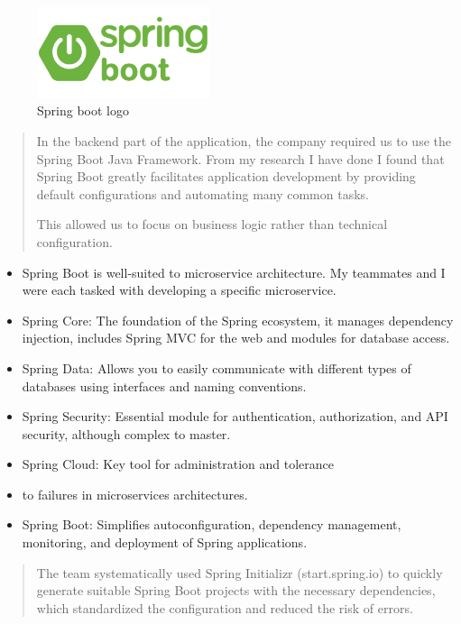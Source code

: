 \documentclass[12pt,a4paper]{report}
\begin{document}
\begin{figure}[H]
\centering
\includegraphics[width=2in]{media/image83.png}
\caption{Spring boot logo}
\label{fig:SBL}
\end{figure} 


\begin{quote}
In the backend part of the application, the company required us to use
the Spring Boot Java Framework. From my research I have done I found
that Spring Boot greatly facilitates application development by
providing default configurations and automating many common tasks.

This allowed us to focus on business logic rather than technical
configuration.
\end{quote}

\begin{itemize}
\item
  Spring Boot is well-suited to microservice architecture. My teammates
  and I were each tasked with developing a specific microservice.
\item
  Spring Core: The foundation of the Spring ecosystem, it manages
  dependency injection, includes Spring MVC for the web and modules for
  database access.
\item
  Spring Data: Allows you to easily communicate with different types of
  databases using interfaces and naming conventions.
\item
  Spring Security: Essential module for authentication, authorization,
  and API security, although complex to master.
\item
  Spring Cloud: Key tool for administration and tolerance
\item
  to failures in microservices architectures.
\item
  Spring Boot: Simplifies autoconfiguration, dependency management,
  monitoring, and deployment of Spring applications.
\end{itemize}

\begin{quote}
The team systematically used Spring Initializr (start.spring.io) to
quickly generate suitable Spring Boot projects with the necessary
dependencies, which standardized the configuration and reduced the risk
of errors.
\end{quote}
\end{document}
